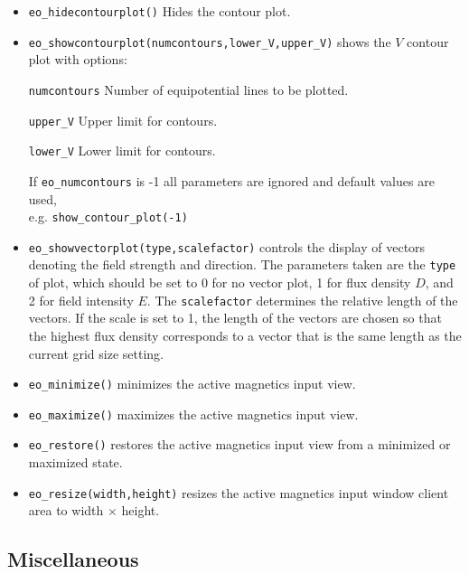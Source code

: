 \begin{itemize}
\item \texttt{eo\_hidecontourplot()} Hides the contour plot.

\item \texttt{eo\_showcontourplot(numcontours,lower{\_}V,upper{\_}V)} shows the
$V$ contour plot with options:

\texttt{numcontours} Number of equipotential lines to be plotted.

\texttt{upper{\_}V} Upper limit for contours.

\texttt{lower{\_}V} Lower limit for contours.

If \texttt{eo\_numcontours} is -1 all parameters are ignored and
default values are used, \\ e.g. \texttt{show{\_}contour{\_}plot(-1)}

\item \texttt{eo\_showvectorplot(type,scalefactor)}
controls the display of vectors denoting the field strength and
direction. The parameters taken are the \texttt{type} of plot,
which should be set to 0 for no vector plot, 1 for flux density
$D$, and 2 for field intensity $E$. The \texttt{scalefactor}
determines the relative length of the vectors. If the scale is set
to 1, the length of the vectors are chosen so that the highest flux
density corresponds to a vector that is the same length as the
current grid size setting.

\item{\tt eo\_minimize()} minimizes the active magnetics input view.

\item{\tt eo\_maximize()} maximizes the active magnetics input view.

\item{\tt eo\_restore()} restores the active magnetics input view from a
 minimized or maximized state.

\item{\tt eo\_resize(width,height)} resizes the active magnetics input
 window client area to width $\times$ height.

\end{itemize}

\subsection{Miscellaneous}

